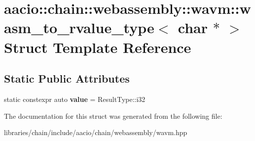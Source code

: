 \hypertarget{structaacio_1_1chain_1_1webassembly_1_1wavm_1_1wasm__to__rvalue__type_3_01char_01_5_01_4}{}\section{aacio\+:\+:chain\+:\+:webassembly\+:\+:wavm\+:\+:wasm\+\_\+to\+\_\+rvalue\+\_\+type$<$ char $\ast$ $>$ Struct Template Reference}
\label{structaacio_1_1chain_1_1webassembly_1_1wavm_1_1wasm__to__rvalue__type_3_01char_01_5_01_4}
\subsection*{Static Public Attributes}
\begin{DoxyCompactItemize}
\item 
\mbox{\label{structaacio_1_1chain_1_1webassembly_1_1wavm_1_1wasm__to__rvalue__type_3_01char_01_5_01_4_a6431df0dbf5426ab92ccb7c8d09ecfe6}} 
static constexpr auto {\bfseries value} = Result\+Type\+::i32
\end{DoxyCompactItemize}


The documentation for this struct was generated from the following file\+:\begin{DoxyCompactItemize}
\item 
libraries/chain/include/aacio/chain/webassembly/wavm.\+hpp\end{DoxyCompactItemize}
